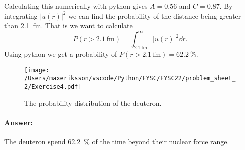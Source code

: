 Calculating this numerically with python gives $A = 0.56$ and $C = 0.87$. By integrating $|u(r)|^2$ we can find the probability of the distance being greater than \SI{2.1}{\femto\m}. That is we want to calculate
\begin{equation}
	P(r > \SI{2.1}{\femto\m}) = \int_{\SI{2.1}{\femto\m}}^\infty |u(r)|^2 \dd r.
\end{equation}
Using python we get a probability of $P(r > \SI{2.1}{\femto\m}) = \SI{62.2}{\percent}$.

\begin{figure}[H]
	\centering
	\texttt{[image: /Users/maxeriksson/vscode/Python/FYSC/FYSC22/problem\_sheet\_2/Exercise4.pdf]}
	\caption{The probability distribution of the deuteron.}
\end{figure}

\paragraph{Answer:} The deuteron spend \SI{62.2}{\percent} of the time beyond their nuclear force range.